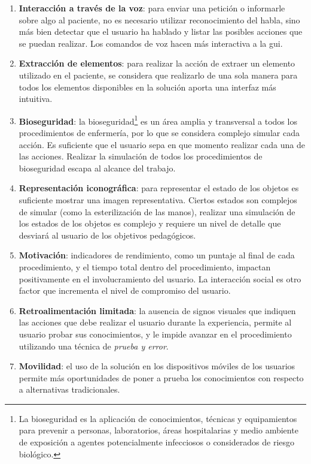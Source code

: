 \begin{enumerate}[\bfseries C1.:]

\item \textbf{Interacción a través de la voz}: para enviar una petición o
    informarle sobre algo al paciente, no es necesario utilizar reconocimiento
    del habla, sino más bien detectar que el usuario ha hablado y listar las posibles
    acciones que se puedan realizar. Los comandos de voz hacen más interactiva a
    la \gls{gui}.
    
\item \textbf{Extracción de elementos}: para realizar la acción de extraer un
    elemento utilizado en el paciente, se considera que realizarlo de una sola
    manera para todos los elementos disponibles en la solución aporta una
    interfaz más intuitiva.

\item \textbf{Bioseguridad}: la bioseguridad\footnote{La bioseguridad es la
        aplicación de conocimientos, técnicas y equipamientos para prevenir a
        personas, laboratorios, áreas hospitalarias y medio ambiente de
        exposición a agentes potencialmente infecciosos o considerados de riesgo
        biológico\cite{world2005manual}.} es un área amplia y transversal a
    todos los procedimientos de enfermería, por lo que se considera complejo
    simular cada acción. Es suficiente que el usuario sepa en que momento
    realizar cada una de las acciones. Realizar la simulación de todos los
    procedimientos de bioseguridad escapa al alcance del trabajo.

\item \textbf{Representación iconográfica}: para representar el estado de los
    objetos es suficiente mostrar una imagen representativa. Ciertos estados son
    complejos de simular (como la esterilización de las manos), realizar una
    simulación de los estados de los objetos es complejo y requiere un nivel de
    detalle que desviará al usuario de los objetivos pedagógicos.
    
\item \textbf{Motivación}: indicadores de rendimiento, como un puntaje al final
    de cada procedimiento, y el tiempo total dentro del procedimiento, impactan
    positivamente en el involucramiento del usuario. La interacción social es
    otro factor que incrementa el nivel de compromiso del usuario.

\item \textbf{Retroalimentación limitada}: la ausencia de signos visuales que
    indiquen las acciones que debe realizar el usuario durante la experiencia,
    permite al usuario probar sus conocimientos, y le impide avanzar en
    el procedimiento utilizando una técnica de \emph{prueba y error}.

\item \textbf{Movilidad}: el uso de la solución en los dispositivos móviles de
    los usuarios permite más oportunidades de poner a prueba los conocimientos
    con respecto a alternativas tradicionales.

\end{enumerate}

